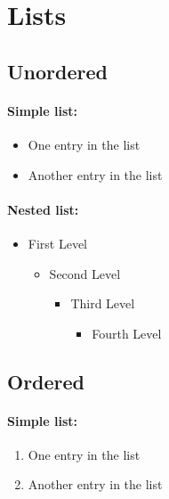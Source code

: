 \documentclass{article}				%
\begin{document}
\section{Lists}

\subsection{Unordered}

\paragraph{Simple list:}

\begin{itemize}
	\item One entry in the list
	\item Another entry in the list
\end{itemize}

\paragraph{Nested list:}

\begin{itemize}
	\item  First Level
	\begin{itemize}
		\item  Second Level
		\begin{itemize}
			\item  Third Level
			\begin{itemize}
				\item  Fourth Level
			\end{itemize}
		\end{itemize}
	\end{itemize}
\end{itemize}

\subsection{Ordered}

\paragraph{Simple list:}

\begin{enumerate}
	\item One entry in the list
	\item Another entry in the list
\end{enumerate}
\end{document}
